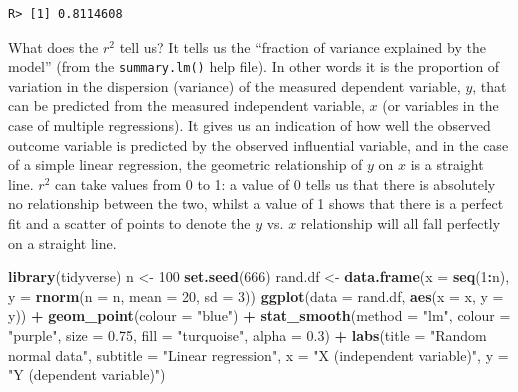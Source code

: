 \documentclass[english,10pt,a4paper,oneside]{book}
\newenvironment{Shaded}{\begin{snugshade}}{\end{snugshade}}
\newcommand{\DataTypeTok}[1]{\textcolor[rgb]{0.13,0.29,0.53}{#1}}
\newcommand{\DecValTok}[1]{\textcolor[rgb]{0.00,0.00,0.81}{#1}}
\newcommand{\FloatTok}[1]{\textcolor[rgb]{0.00,0.00,0.81}{#1}}
\newcommand{\KeywordTok}[1]{\textcolor[rgb]{0.13,0.29,0.53}{\textbf{#1}}}
\newcommand{\NormalTok}[1]{#1}
\newcommand{\OperatorTok}[1]{\textcolor[rgb]{0.81,0.36,0.00}{\textbf{#1}}}
\newcommand{\StringTok}[1]{\textcolor[rgb]{0.31,0.60,0.02}{#1}}
\theoremstyle{definition}
\theoremstyle{definition}
\theoremstyle{definition}
\theoremstyle{remark}
\begin{document}
\begin{verbatim}
R> [1] 0.8114608
\end{verbatim}

What does the \(r^{2}\) tell us? It tells us the \enquote{fraction of
variance explained by the model} (from the \texttt{summary.lm()} help
file). In other words it is the proportion of variation in the
dispersion (variance) of the measured dependent variable, \(y\), that
can be predicted from the measured independent variable, \(x\) (or
variables in the case of multiple regressions). It gives us an
indication of how well the observed outcome variable is predicted by the
observed influential variable, and in the case of a simple linear
regression, the geometric relationship of \(y\) on \(x\) is a straight
line. \(r^{2}\) can take values from 0 to 1: a value of 0 tells us that
there is absolutely no relationship between the two, whilst a value of 1
shows that there is a perfect fit and a scatter of points to denote the
\(y\) vs. \(x\) relationship will all fall perfectly on a straight line.

\begin{Shaded}
\begin{Highlighting}[]
\KeywordTok{library}\NormalTok{(tidyverse)}
\NormalTok{n <-}\StringTok{ }\DecValTok{100}
\KeywordTok{set.seed}\NormalTok{(}\DecValTok{666}\NormalTok{)}
\NormalTok{rand.df <-}\StringTok{ }\KeywordTok{data.frame}\NormalTok{(}\DataTypeTok{x =} \KeywordTok{seq}\NormalTok{(}\DecValTok{1}\OperatorTok{:}\NormalTok{n),}
                      \DataTypeTok{y =} \KeywordTok{rnorm}\NormalTok{(}\DataTypeTok{n =}\NormalTok{ n, }\DataTypeTok{mean =} \DecValTok{20}\NormalTok{, }\DataTypeTok{sd =} \DecValTok{3}\NormalTok{))}
\KeywordTok{ggplot}\NormalTok{(}\DataTypeTok{data =}\NormalTok{ rand.df, }\KeywordTok{aes}\NormalTok{(}\DataTypeTok{x =}\NormalTok{ x, }\DataTypeTok{y =}\NormalTok{ y)) }\OperatorTok{+}
\StringTok{  }\KeywordTok{geom_point}\NormalTok{(}\DataTypeTok{colour =} \StringTok{"blue"}\NormalTok{) }\OperatorTok{+}
\StringTok{  }\KeywordTok{stat_smooth}\NormalTok{(}\DataTypeTok{method =} \StringTok{"lm"}\NormalTok{, }\DataTypeTok{colour =} \StringTok{"purple"}\NormalTok{, }\DataTypeTok{size =} \FloatTok{0.75}\NormalTok{, }\DataTypeTok{fill =} \StringTok{"turquoise"}\NormalTok{, }\DataTypeTok{alpha =} \FloatTok{0.3}\NormalTok{) }\OperatorTok{+}
\StringTok{  }\KeywordTok{labs}\NormalTok{(}\DataTypeTok{title =} \StringTok{"Random normal data"}\NormalTok{,}
       \DataTypeTok{subtitle =} \StringTok{"Linear regression"}\NormalTok{,}
       \DataTypeTok{x =} \StringTok{"X (independent variable)"}\NormalTok{,}
       \DataTypeTok{y =} \StringTok{"Y (dependent variable)"}\NormalTok{)}
\end{Highlighting}
\end{Shaded}
\end{document}

